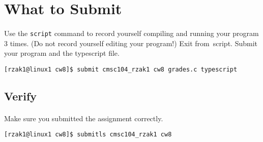 \documentclass[letter,11pt]{article}
\begin{document}
\section*{What to Submit}
\paragraph{}Use the \texttt{script} command to record yourself compiling and running your program 3 times. (Do not record yourself editing your program!) Exit from script. Submit your program and the typescript file.
\begin{verbatim}
[rzak1@linux1 cw8]$ submit cmsc104_rzak1 cw8 grades.c typescript
\end{verbatim}

\subsection*{Verify}
\paragraph{}Make sure you submitted the assignment correctly.
\begin{verbatim}
[rzak1@linux1 cw8]$ submitls cmsc104_rzak1 cw8
\end{verbatim}
\end{document}
